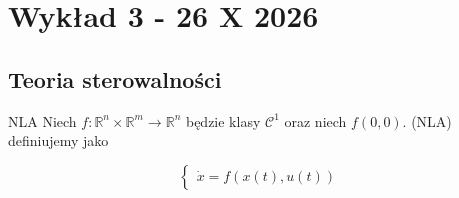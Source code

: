 \chapter{Wykład 3 - 26 X 2026}

\section{Teoria sterowalności}

\begin{definition}{NLA}{}
    Niech $f \colon \mathbb{R}^n \times \mathbb{R}^m \to \mathbb{R}^n$ będzie klasy $\mathscr{C}^1$ oraz niech $f(0, 0)$. (NLA) definiujemy jako

    \begin{equation}
        \begin{cases}
            \dot{x} = f(x(t), u(t))
        \end{cases}
    \end{equation}
    \label{eq:NLA}
\end{definition}

